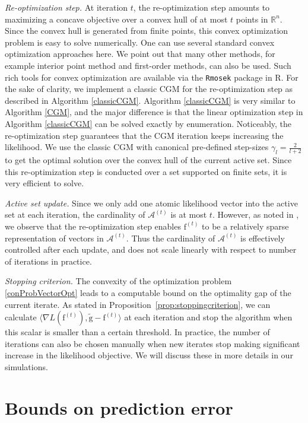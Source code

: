 \documentclass[11pt]{article}
\numberwithin{equation}{section}
\newcommand{\RS}{\mathbb{R}}
\newcommand{\fv}{\mathrm{f}}
\newcommand{\gv}{\mathrm{g}}
\begin{document}
\emph{Re-optimization step.} At iteration $t$, the re-optimization step amounts to maximizing a concave objective over a convex hull of at most $t$ points in $\RS^n$. Since the convex hull is generated from finite points, this convex optimization problem is easy to solve numerically. One can use several standard convex optimization approaches here.  We point out that many other methods, for example interior point method and first-order methods, can also be used. 
Such rich tools for convex optimization are available via the \texttt{Rmosek} package \citep{rmosek} in R. For the sake of clarity, we implement a classic CGM for the re-optimization step as described in Algorithm \ref{classicCGM}. Algorithm \ref{classicCGM} is very similar to Algorithm \ref{CGM}, and the major difference is that the linear optimization step in Algorithm \ref{classicCGM} can be solved exactly by enumeration. Noticeably, the re-optimization step guarantees that the CGM iteration keeps increasing the likelihood. We use the classic CGM with canonical pre-defined step-sizes $\gamma_l = \frac{2}{l+2}$ to get the optimal solution over the convex hull of the current active set. Since this re-optimization step is conducted over a set supported on finite sets, it is very efficient to solve. 

\emph{Active set update.} Since we only add one atomic likelihood vector into the active set at each iteration, the cardinality of $\mathcal{A}^{(t)}$ is at most $t$. However, as noted in \citet{jaggi2013revisiting} , we observe that the re-optimization step enables $\fv^{(t)}$ to be a relatively sparse representation of vectors in $\mathcal{A}^{(t)}$. Thus the cardinality of $\mathcal{A}^{(t)}$ is effectively controlled after each update, and does not scale linearly with respect to number of iterations in practice.

\emph{Stopping criterion.} The convexity of the optimization problem \eqref{conProbVectorOpt} leads to a computable bound on the optimality gap of the current iterate. As stated in Proposition~\ref{prop:stoppingcriterion}, we can calculate $\langle \nabla L(\fv^{(t)}), \tilde{\gv} - \fv^{(t)} \rangle$ at  each iteration and stop the algorithm when this scalar is smaller than a certain threshold. In practice, the number of iterations can also be chosen manually when new iterates stop making significant increase in the likelihood objective. We will discuss these in more details in our simulations.


\section{Bounds on prediction error}
\end{document}
